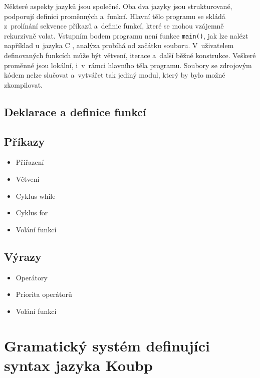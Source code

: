 Některé aspekty jazyků jsou společné. 
Oba dva jazyky jsou strukturované, podporují definici proměnných a~funkcí.
Hlavní tělo programu se skládá z~prolínání sekvence příkazů a~definic funkcí, které se mohou vzájemně rekurzivně volat.
Vstupním bodem programu není funkce \texttt{main()}, jak lze nalézt například u~jazyka C \cite{ISO-C-Standard}, analýza probíhá od začátku souboru.
V~uživatelem definovaných funkcích může být větvení, iterace a~další běžné konstrukce.
Veškeré proměnné jsou lokální, i~v~rámci hlavního těla programu.
Soubory se zdrojovým kódem nelze slučovat a~vytvářet tak jediný modul, který by bylo možné zkompilovat.

\subsection*{Deklarace a definice funkcí}

\subsection*{Příkazy}

\begin{itemize}
    \item Přiřazení
    \item Větvení
    \item Cyklus while
    \item Cyklus for
    \item Volání funkcí
\end{itemize}


\subsection*{Výrazy}

\begin{itemize}
    \item Operátory
    \item Priorita operátorů
    \item Volání funkcí
\end{itemize}

\section{Gramatický systém definujíci syntax jazyka Koubp}
